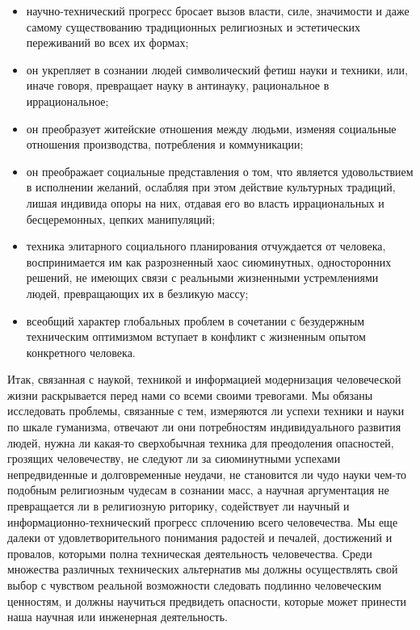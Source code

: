 \begin{itemize}
  
\item{научно-технический прогресс бросает вызов власти, силе, значимости и даже самому существованию традиционных религиозных и эстетических переживаний во всех их формах;}
  
\item{он укрепляет в сознании людей символический фетиш науки и техники, или, иначе говоря, превращает науку в антинауку, рациональное в иррациональное;}
  
\item{он преобразует житейские отношения между людьми, изменяя социальные отношения производства, потребления и коммуникации;}
  
\item{он преображает социальные представления о том, что является удовольствием в исполнении желаний, ослабляя при этом действие культурных традиций, лишая индивида опоры на них, отдавая его во власть иррациональных и бесцеремонных, цепких манипуляций;}
  
\item{техника элитарного социального планирования отчуждается от человека, воспринимается им как разрозненный хаос сиюминутных, односторонних решений, не имеющих связи с реальными жизненными устремлениями людей, превращающих их в безликую массу;}
  
\item{всеобщий характер глобальных проблем в сочетании с безудержным техническим оптимизмом вступает в конфликт с жизненным опытом конкретного человека.}
\end{itemize}

Итак, связанная с наукой, техникой и информацией модернизация человеческой жизни раскрывается перед нами со всеми своими тревогами. Мы обязаны исследовать проблемы, связанные с тем, измеряются ли успехи техники и науки по шкале гуманизма, отвечают ли они потребностям индивидуального развития людей, нужна ли какая-то сверхобычная техника для преодоления опасностей, грозящих человечеству, не следуют ли за сиюминутными успехами непредвиденные и долговременные неудачи, не становится ли чудо науки чем-то подобным религиозным чудесам в сознании масс, а научная аргументация не превращается ли в религиозную риторику, содействует ли научный и информационно-технический прогресс сплочению всего человечества. Мы еще далеки от удовлетворительного понимания радостей и печалей, достижений и провалов, которыми полна техническая деятельность человечества. Среди множества различных технических альтернатив мы должны осуществлять свой выбор с чувством реальной возможности следовать подлинно человеческим ценностям, и должны научиться предвидеть опасности, которые может принести наша научная или инженерная деятельность.
